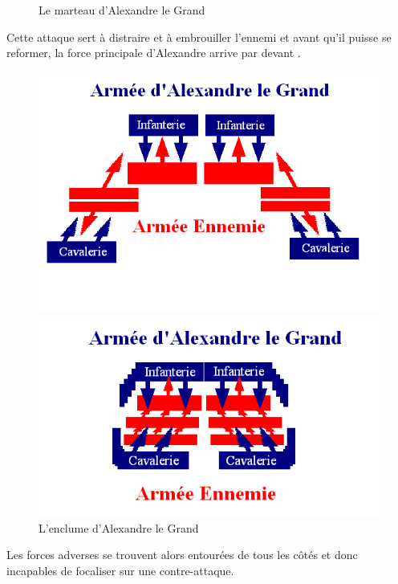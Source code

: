 \documentclass{article}
\begin{document}
\begin{center}
\begin{figure}[H]
\hfill
\caption{Le \og{}marteau\fg{} d'Alexandre le Grand}
\end{figure}
Cette attaque sert à distraire et à embrouiller l'ennemi et avant qu'il puisse se reformer, la force principale d'Alexandre arrive par devant \cite{Alexanders_tactics}.
\begin{figure}[H]
\hfill
\begin{minipage}[H]{0.5\linewidth}
	\centering
	\includegraphics[width=\linewidth]{../ressources/enclume}
\end{minipage}
\hfill
\begin{minipage}[H]{0.45\linewidth}
	\centering
	\includegraphics[width=\linewidth]{../ressources/enclume2}
\end{minipage}
\hfill
\caption{\og{}L'enclume\fg{} d'Alexandre le Grand \cite{Alexanders_tactics}}
\end{figure}
\end{center}
Les forces adverses se trouvent alors entourées de tous les côtés et donc incapables de focaliser sur une contre-attaque.
\end{document}
